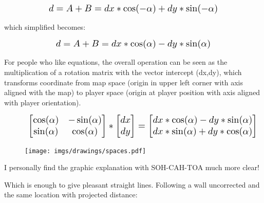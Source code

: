 \begin{figure}[H]
  \centering
  \begin{equation*}
    \scalebox{1.3}{
$d = A + B = dx * \cos(-\alpha) + dy * \sin(-\alpha) $ 
 }
  \end{equation*}
\end{figure}
which simplified becomes: 

\begin{figure}[H]
  \centering
  \begin{equation*}
    \scalebox{1.3}{
$d = A + B = dx * \cos(\alpha) - dy * \sin(\alpha) $
 }
  \end{equation*}
\end{figure}
\par
For people who like equations, the overall operation can be seen as the multiplication of a rotation matrix with the vector intercept (dx,dy), which transforms coordinate from map space (origin in upper left corner with axis aligned with the map) to player space (origin at player position with axis aligned with player orientation).
\begin{figure}[H]
  \centering
  \begin{equation*}
    \scalebox{1.3}{
    $
      \begin{bmatrix} 
        \cos(\alpha) & -\sin(\alpha) \\ 
        \sin(\alpha) & \cos(\alpha) 
      \end{bmatrix} 
       *
      \begin{bmatrix} 
        dx \\ 
        dy 
      \end{bmatrix}
       =
      \begin{bmatrix} 
        dx*\cos(\alpha) - dy*\sin(\alpha) \\ 
        dx*\sin(\alpha) + dy*\cos(\alpha) 
      \end{bmatrix} 
      $
    }
  \end{equation*}
\end{figure}

\begin{figure}[H]
\centering
 \texttt{[image: imgs/drawings/spaces.pdf]}
 \end{figure}


I personally find the graphic explanation with SOH-CAH-TOA much more clear!
\par

 Which is enough to give pleasant straight lines. Following a wall uncorrected and the same location with projected distance:\\

